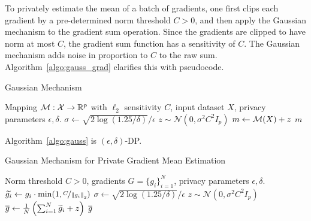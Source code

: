 To privately estimate the mean of a batch of gradients, one first clips each gradient by a pre-determined norm threshold $C > 0$, and then apply the Gaussian mechanism to the gradient sum operation. 
Since the gradients are clipped to have norm at most $C$, the gradient sum function has a sensitivity of $C$. 
The Gaussian mechanism adds noise in proportion to $C$ to the raw sum.
Algorithm~\ref{algo:gauss_grad} clarifies this with pseudocode.
\begin{algorithm}[H]
\centering
\caption{Gaussian Mechanism}
\begin{algorithmic}[1]
    Mapping $\mathcal{M}: \mathcal{X} \to \mathbb{R}^p$ with $\ell_2$ sensitivity $C$, input dataset $X$, privacy parameters $\epsilon, \delta$.
  \State $\sigma \gets  \sqrt{2 \log(1.25 / \delta) } / \epsilon $
  \State $z \sim \mathcal{N}(0, \sigma^2 C^2 I_p)$
  \State $m \gets \mathcal{M}(X) + z$
  \State \Return $m$
\end{algorithmic}
\label{algo:gauss}
\end{algorithm}

\begin{theo}
\label{theo:gauss}
Algorithm~\ref{algo:gauss} is $(\epsilon, \delta)$-DP.
\end{theo}

\begin{algorithm}[H]
\centering
\caption{Gaussian Mechanism for Private Gradient Mean Estimation}
\begin{algorithmic}[1]
  Norm threshold $C > 0$, gradients $G = \{g_i\}_{i=1}^N$, privacy parameters $\epsilon, \delta$.
      \State $\widetilde{g_i} \gets g_i \cdot \min(1, \nicefrac{C}{ \left\lVert g_i\right\rVert_2 })$ 
  \EndFor
  \State $\sigma \gets  \sqrt{2 \log(1.25 / \delta) } / \epsilon $
  \State $z \sim \mathcal{N}(0, \sigma^2 C^2 I_p)$
  \State $\mathop{\overline{g}} \gets \frac{1}{N}\left(\sum_{i=1}^N \widetilde{g}_i + z\right)$
  \State \Return $\mathop{\overline{g}}$
\end{algorithmic}
\label{algo:gauss_grad}
\end{algorithm}

